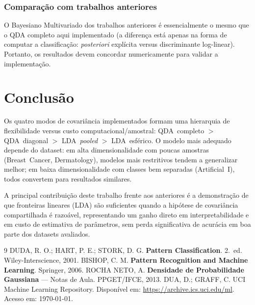 \documentclass[12pt, a4paper]{article}
\begin{document}
\subsubsection{Comparação com trabalhos anteriores}

O Bayesiano Multivariado dos trabalhos anteriores é essencialmente o
mesmo que o QDA completo aqui implementado (a diferença está apenas na
forma de computar a classificação: \textit{posteriori} explícita
versus discriminante log-linear). Portanto, os resultados devem
concordar numericamente para validar a implementação.

\section{Conclusão}

Os quatro modos de covariância implementados formam uma hierarquia de
flexibilidade versus custo computacional/amostral: QDA~completo $>$
QDA~diagonal $>$ LDA~\textit{pooled} $>$ LDA~esférico. O modelo mais
adequado depende do dataset: em alta dimensionalidade com poucas
amostras (Breast~Cancer, Dermatology), modelos mais restritivos
tendem a generalizar melhor; em baixa dimensionalidade com classes bem
separadas (Artificial~I), todos convertem para resultados similares.

A principal contribuição deste trabalho frente aos anteriores é a
demonstração de que fronteiras lineares (LDA) são suficientes quando
a hipótese de covariância compartilhada é razoável, representando um
ganho direto em interpretabilidade e em custo de estimativa de
parâmetros, sem perda significativa de acurácia em boa parte dos
datasets avaliados.

\newpage
\begin{thebibliography}{9}
     DUDA, R. O.; HART, P. E.; STORK, D. G\@.
        \textbf{Pattern Classification}. 2.~ed. Wiley-Interscience, 2001.
     BISHOP, C. M\@.
        \textbf{Pattern Recognition and Machine Learning}. Springer, 2006.
     ROCHA NETO, A\@.
        \textbf{Densidade de Probabilidade Gaussiana} --- Notas de Aula.
        PPGET/IFCE, 2013.
     DUA, D.; GRAFF, C\@. UCI Machine Learning Repository.
        Disponível em: \url{https://archive.ics.uci.edu/ml}. Acesso em: \today.
\end{thebibliography}
\end{document}
